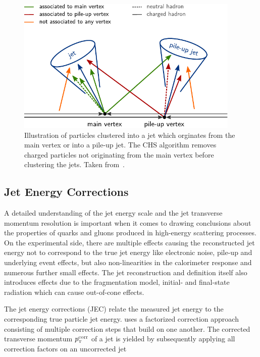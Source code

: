 \begin{figure}[h!tbp]
    \centering
    \includegraphics[width=0.95\textwidth]{figures/jet_reconstruction/chs.pdf}
    \caption[Charged Hadron Subtraction]{Illustration of particles clustered
    into a jet which orginates from the main vertex or into a pile-up jet. The
    CHS algorithm removes charged particles not originating from the main vertex
    before clustering the jets. Taken from~\cite{Berger:2014aca}.}
    \label{fig:chs_jets}
\end{figure}


\subsection{Jet Energy Corrections}
\label{sec:jec}

A detailed understanding of the jet energy scale and the jet transverse momentum
resolution is important when it comes to drawing conclusions about the
properties of quarks and gluons produced in high-energy scattering processes. On the
experimental side, there are multiple effects causing the reconstructed jet
energy not to correspond to the true jet energy like electronic noise, pile-up
and underlying event effects, but also non-linearities in the calorimeter
response and numerous further small effects. The jet reconstruction and
definition itself also introduces effects due to the fragmentation model,
initial- and final-state radiation which can cause out-of-cone effects.

The jet energy corrections (JEC) relate the measured jet energy to the
corresponding true particle jet energy. \CMS uses a factorized correction approach
consisting of multiple correction steps that build on one another. The corrected
transverse momentum $\pt^{\mathrm{corr}}$ of a jet is yielded by subsequently applying all correction
factors on an uncorrected jet

